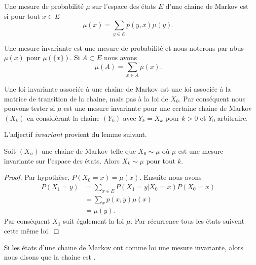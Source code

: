 \begin{definition}
	Une mesure de probabilité \( \mu\) sur l'espace des états \( E\) d'une chaine de Markov est  si pour tout \( x\in E\)
	\begin{equation}
		\mu(x)=\sum_{y\in E}p(y,x)\mu(y).
	\end{equation}
\end{definition}
\begin{remark}
	Une mesure invariante est une mesure de probabilité et nous noterons par abus \(  \mu(x)\) pour \( \mu(\{x\})\). Si \( A\subset E\) nous avons
	\begin{equation}
		\mu(A)=\sum_{x\in A}\mu(x).
	\end{equation}
\end{remark}

\begin{remark}  \label{RemwcRRFZ}
	Une loi invariante associée à une chaine de Markov est une loi associée à la matrice de transition de la chaine, mais pas à la loi de \( X_0\). Par conséquent nous pouvons tester si \( \mu\) est une mesure invariante pour une certaine chaine de Markov \( (X_k)\) en considérant la chaine \( (Y_k)\) avec \( Y_k=X_k\) pour \( k>0\) et \( Y_0\) arbitraire.
\end{remark}

L'adjectif \emph{invariant} provient du lemme suivant.
\begin{lemma}       \label{LemUVMwbM}
	Soit \( (X_n)\) une chaine de Markov telle que \( X_0\sim\mu\) où \( \mu\) est une mesure invariante sur l'espace des états. Alors \( X_k\sim \mu\) pour tout \( k\).
\end{lemma}

\begin{proof}
	Par hypothèse, \( P(X_0=x)=\mu(x)\). Ensuite nous avons
	\begin{subequations}
		\begin{align}
			P(X_1=y) & =\sum_{x\in E}P(X_1=y|X_0=x)P(X_0=x) \\
			         & =\sum_xp(x,y)\mu(x)                  \\
			         & =\mu(y).
		\end{align}
	\end{subequations}
	Par conséquent \( X_1\) suit également la loi \( \mu\). Par récurrence tous les états suivent cette même loi.
\end{proof}

\begin{definition}
    Si les états d'une chaine de Markov ont comme loi une mesure invariante, alors nous disons que la chaine est .
\end{definition}

